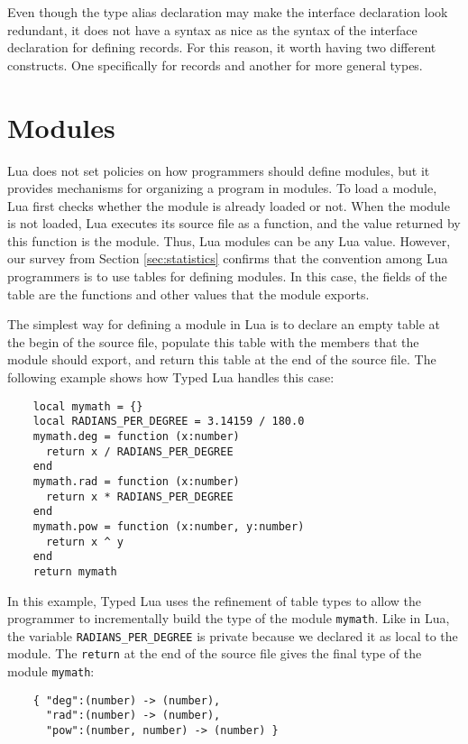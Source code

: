 Even though the type alias declaration may make the interface declaration
look redundant, it does not have a syntax as nice as the syntax
of the interface declaration for defining records.
For this reason, it worth having two different constructs.
One specifically for records and another for more general types.

\section{Modules}
\label{sec:modules}

Lua does not set policies on how programmers should define modules,
but it provides mechanisms for organizing a program in modules.
To load a module, Lua first checks whether the module is already
loaded or not.
When the module is not loaded, Lua executes its source file as a
function, and the value returned by this function is the module.
Thus, Lua modules can be any Lua value.
However, our survey from Section \ref{sec:statistics} confirms that
the convention among Lua programmers is to use tables for defining modules. 
In this case, the fields of the table are the functions and other
values that the module exports.

The simplest way for defining a module in Lua is to declare an
empty table at the begin of the source file,
populate this table with the members that the module should export,
and return this table at the end of the source file. 
The following example shows how Typed Lua handles this case:
\begin{verbatim}
    local mymath = {}
    local RADIANS_PER_DEGREE = 3.14159 / 180.0
    mymath.deg = function (x:number)
      return x / RADIANS_PER_DEGREE
    end
    mymath.rad = function (x:number)
      return x * RADIANS_PER_DEGREE
    end
    mymath.pow = function (x:number, y:number)
      return x ^ y
    end
    return mymath
\end{verbatim}

In this example, Typed Lua uses the refinement of table types to
allow the programmer to incrementally build the type of the
module \texttt{mymath}.
Like in Lua, the variable \texttt{RADIANS\string_PER\string_DEGREE}
is private because we declared it as local to the module. 
The \texttt{return} at the end of the source file gives the
final type of the module \texttt{mymath}:
\begin{verbatim}
    { "deg":(number) -> (number),
      "rad":(number) -> (number),
      "pow":(number, number) -> (number) }
\end{verbatim}

